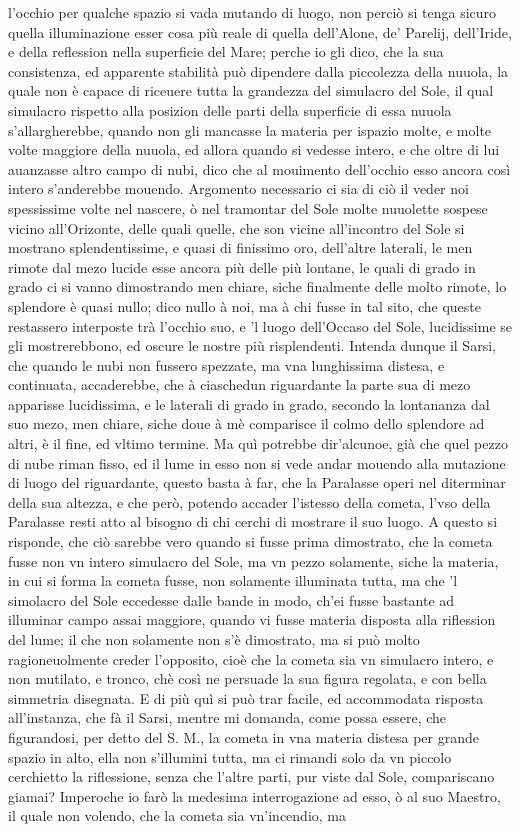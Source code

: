 \documentclass[11pt,twoside,openany]{book}
\begin{document}
l'occhio per qualche spazio si vada mutando di luogo, non perciò si tenga sicuro quella illuminazione esser cosa più reale di quella dell'Alone, de' Parelij, dell'Iride, e della reflession nella superficie del Mare; perche io gli dico, che la sua consistenza, ed apparente stabilità può dipendere dalla piccolezza della nuuola, la quale non è capace di riceuere tutta la grandezza del simulacro del Sole, il qual simulacro rispetto alla posizion delle parti della superficie di essa nuuola s'allargherebbe, quando non gli mancasse la materia per ispazio molte, e molte volte maggiore della nuuola, ed allora quando si vedesse intero, e che oltre di lui auanzasse altro campo di nubi, dico che al mouimento dell'occhio esso ancora così intero s'anderebbe mouendo. Argomento necessario ci sia di ciò il veder noi spessissime volte nel nascere, ò nel tramontar del Sole molte nuuolette sospese vicino all'Orizonte, delle quali quelle, che son vicine all'incontro del Sole si mostrano splendentissime, e quasi di finissimo oro, dell'altre laterali, le men rimote dal mezo lucide esse ancora più delle più lontane, le quali di grado in grado ci si vanno dimostrando men chiare, siche finalmente delle molto rimote, lo splendore è quasi nullo; dico nullo à noi, ma à chi fusse in tal sito, che queste restassero interposte trà l'occhio suo, e 'l luogo dell'Occaso del Sole, lucidissime se gli mostrerebbono, ed oscure le nostre più risplendenti. Intenda dunque il Sarsi, che quando le nubi non fussero spezzate, ma vna lunghissima distesa, e continuata, accaderebbe, che à ciaschedun riguardante la parte sua di mezo apparisse lucidissima, e le laterali di grado in grado, secondo la lontananza dal suo mezo, men chiare, siche doue à mè comparisce il colmo dello splendore ad altri, è il fine, ed vltimo termine. Ma quì potrebbe dir'alcunoe, già che quel pezzo di nube riman fisso, ed il lume in esso non si vede andar mouendo alla mutazione di luogo del riguardante, questo basta à far, che la Paralasse operi nel diterminar della sua altezza, e che però, potendo accader l'istesso della cometa, l'vso della Paralasse resti atto al bisogno di chi cerchi di mostrare il suo luogo. A questo si risponde, che ciò sarebbe vero quando si fusse prima dimostrato, che la cometa fusse non vn intero simulacro del Sole, ma vn pezzo solamente, siche la materia, in cui si forma la cometa fusse, non solamente illuminata tutta, ma che 'l simolacro del Sole eccedesse dalle bande in modo, ch'ei fusse bastante ad illuminar campo assai maggiore, quando vi fusse materia disposta alla riflession del lume; il che non solamente non s'è dimostrato, ma si può molto ragioneuolmente creder l'opposito, cioè che la cometa sia vn simulacro intero, e non mutilato, e tronco, chè così ne persuade la sua figura regolata, e con bella simmetria disegnata. E di più quì si può trar facile, ed accommodata risposta all'instanza, che fà il Sarsi, mentre mi domanda, come possa essere, che figurandosi, per detto del S. M., la cometa in vna materia distesa per grande spazio in alto, ella non s'illumini tutta, ma ci rimandi solo da vn piccolo cerchietto la riflessione, senza che l'altre parti, pur viste dal Sole, compariscano giamai? Imperoche io farò la medesima interrogazione ad esso, ò al suo Maestro, il quale non volendo, che la cometa sia vn'incendio, ma 
\end{document}

